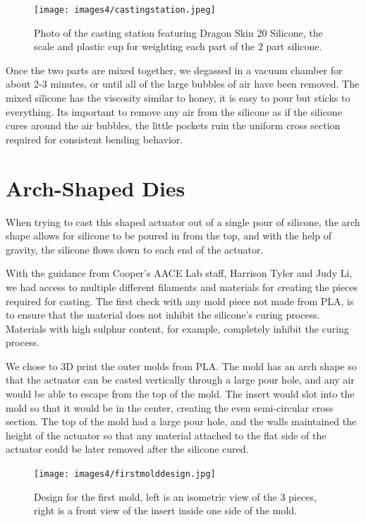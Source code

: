 \begin{figure}[h]
    \centering
    \texttt{[image: images4/castingstation.jpeg]}
    \caption{Photo of the casting station featuring Dragon Skin 20 Silicone, the scale and plastic cup for weighting each part of the 2 part silicone.}
    \label{fig:castingstation}
\end{figure}

Once the two parts are mixed together, we degassed in a vacuum chamber for about 2-3 minutes, or until all of the large bubbles of air have been removed. The mixed silicone has the viscosity similar to honey, it is easy to pour but sticks to everything. Its important to remove any air from the silicone as if the silicone cures around the air bubbles, the little pockets ruin the uniform cross section required for consistent bending behavior. 

\section{Arch-Shaped Dies}

When trying to cast this shaped actuator out of a single pour of silicone, the arch shape allows for silicone to be poured in from the top, and with the help of gravity, the silicone flows down to each end of the actuator. 

With the guidance from Cooper's AACE Lab staff, Harrison Tyler and Judy Li, we had access to multiple different filaments and materials for creating the pieces required for casting. The first check with any mold piece not made from PLA, is to ensure that the material does not inhibit the silicone's curing process. Materials with high sulphur content, for example, completely inhibit the curing process. 

We chose to 3D print the outer molds from PLA. The mold has an arch shape so that the actuator can be casted vertically through a large pour hole, and any air would be able to escape from the top of the mold. The insert would slot into the mold so that it would be in the center, creating the even semi-circular cross section. The top of the mold had a large pour hole, and the walls maintained the height of the actuator so that any material attached to the flat side of the actuator could be later removed after the silicone cured. 

\begin{figure}[h]
    \centering
    \texttt{[image: images4/firstmolddesign.jpg]}
    \caption{Design for the first mold, left is an isometric view of the 3 pieces, right is a front view of the insert inside one side of the mold.}
    \label{fig:firstmold}
\end{figure}

